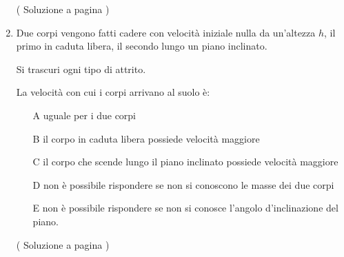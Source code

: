 \begin{enumerate}
( Soluzione a pagina \pageref{sol_p_4} )



\item \label{ex_p_5}
Due corpi vengono fatti cadere con velocità iniziale nulla da un’altezza $h$, il primo in
caduta libera, il secondo lungo un piano inclinato. 

Si trascuri ogni tipo di attrito. 

La velocità con cui i corpi arrivano al suolo è:

\begin{itemize}
\item[A] uguale per i due corpi
\item[B] il corpo in caduta libera possiede velocità maggiore
\item[C] il corpo che scende lungo il piano inclinato possiede velocità maggiore
\item[D] non è possibile rispondere se non si conoscono le masse dei due corpi
\item[E] non è possibile rispondere se non si conosce l’angolo d’inclinazione del piano.
\end{itemize}

( Soluzione a pagina \pageref{sol_p_5} )

\end{enumerate}


